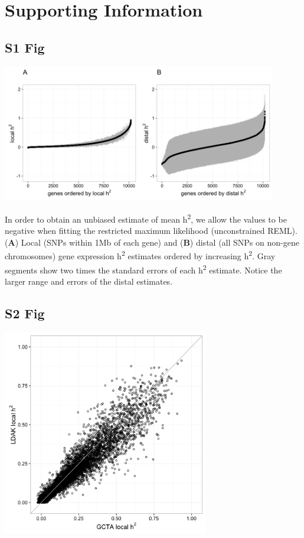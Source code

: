 \documentclass[10pt,letterpaper]{article}
\begin{document}


\section*{Supporting Information}

\begin{singlespace}

\subsection*{S1 Fig}
\includegraphics[width=12cm]{Figures/Fig-DGN-jt-h2-UNCONSTRAINED.png}
\label{S1_Fig}

In order to obtain an unbiased estimate of mean h\textsuperscript{2}, we allow the values to be negative when fitting the restricted maximum likelihood (unconstrained REML). (\textbf{A}) Local (SNPs within 1Mb of each gene) and (\textbf{B}) distal (all SNPs on non-gene chromosomes) gene expression h\textsuperscript{2} estimates ordered by increasing h\textsuperscript{2}. Gray segments show two times the standard errors of each h\textsuperscript{2} estimate. Notice the larger range and errors of the distal estimates.

\pagebreak

\subsection*{S2 Fig}
\includegraphics[width=9cm]{Figures/Fig-LDAK-gcta-no-cons.png}
\label{S2_Fig}


\end{singlespace}
\end{document}

